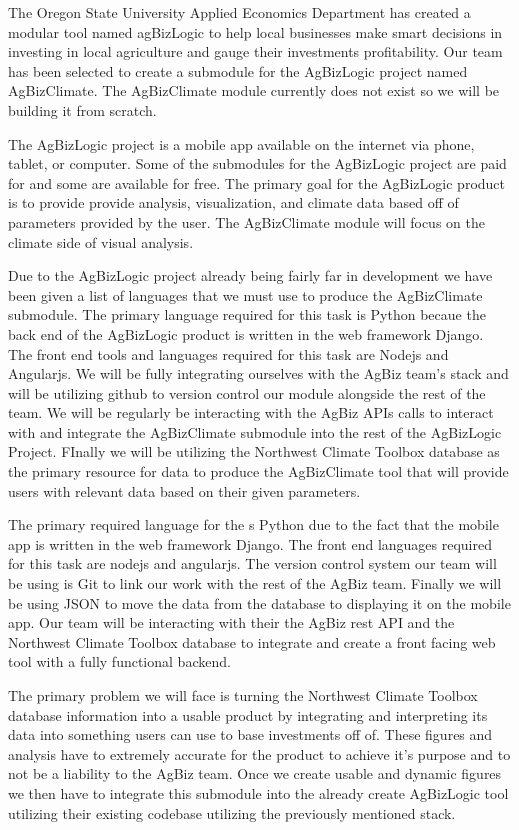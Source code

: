 \documentclass[letterpaper,10pt]{article}
\begin{document}
The Oregon State University Applied Economics Department has created a modular tool named agBizLogic to help local businesses make smart decisions in investing in local agriculture and gauge their investments profitability. Our team has been selected to create a submodule for the AgBizLogic project named AgBizClimate. The AgBizClimate module currently does not exist so we will be building it from scratch.

The AgBizLogic project is a mobile app available on the internet via phone, tablet, or computer. Some of the submodules for the AgBizLogic project are paid for and some are available for free. The primary goal for the AgBizLogic product is to provide provide analysis, visualization, and climate data based off of parameters provided by the user. The AgBizClimate module will focus on the climate side of visual analysis.

Due to the AgBizLogic project already being fairly far in development we have been given a list of languages that we must use to produce the AgBizClimate submodule. The primary language required for this task is Python becaue the back end of the AgBizLogic product is written in the web framework Django. The front end tools and languages required for this task are Nodejs and Angularjs. We will be fully integrating ourselves with the AgBiz team’s stack and will be utilizing github to version control our module alongside the rest of the team. We will be regularly be interacting with the AgBiz APIs calls to interact with and integrate the AgBizClimate submodule into the rest of the AgBizLogic Project. FInally we will be utilizing the Northwest Climate Toolbox database as the primary resource for data to produce the AgBizClimate tool that will provide users with relevant data based on their given parameters. 

The primary required language for the s Python due to the fact that the mobile app is written in the web framework Django. The front end languages required for this task are nodejs and angularjs. The version control system our team will be using is Git to link our work with the rest of the AgBiz team. Finally we will be using JSON to move the data from the database to displaying it on the mobile app. Our team will be interacting with their the AgBiz rest API and the Northwest Climate Toolbox database to integrate and create a front facing web tool with a fully functional backend.

The primary problem we will face is turning the Northwest Climate Toolbox database information into a usable product by integrating and interpreting its data into something users can use to base investments off of. These figures and analysis have to extremely accurate for the product to achieve it’s purpose and to not be a liability to the AgBiz team. Once we create usable and dynamic figures we then have to integrate this submodule into the already create AgBizLogic tool utilizing their existing codebase utilizing the previously mentioned stack.
\end{document}
